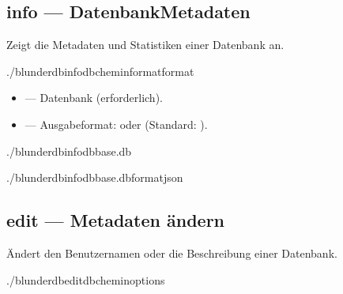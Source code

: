 \documentclass[letterpaper,10pt,german]{sphinxmanual}
\begin{document}
\subsection{info — Datenbank\sphinxhyphen{}Metadaten}
\label{\detokenize{cli:info-metadonnees-de-la-base}}
\sphinxAtStartPar
Zeigt die Metadaten und Statistiken einer Datenbank an.

\begin{sphinxVerbatim}[commandchars=\\\{\}]
./blunderdbinfo\PYGZhy{}\PYGZhy{}db\PYGZlt{}chemin\PYGZgt{}\PYG{o}{[}\PYGZhy{}\PYGZhy{}format\PYGZlt{}format\PYGZgt{}\PYG{o}{]}
\end{sphinxVerbatim}

\sphinxAtStartPar
{}
\begin{itemize}
\item {} 
\sphinxAtStartPar
{} — Datenbank (erforderlich).

\item {} 
\sphinxAtStartPar
{} — Ausgabeformat:  oder  (Standard: ).

\end{itemize}

\sphinxAtStartPar
{}

\begin{sphinxVerbatim}[commandchars=\\\{\}]
./blunderdbinfo\PYGZhy{}\PYGZhy{}dbbase.db

./blunderdbinfo\PYGZhy{}\PYGZhy{}dbbase.db\PYGZhy{}\PYGZhy{}formatjson
\end{sphinxVerbatim}


\subsection{edit — Metadaten ändern}
\label{\detokenize{cli:edit-modifier-les-metadonnees}}
\sphinxAtStartPar
Ändert den Benutzernamen oder die Beschreibung einer Datenbank.

\begin{sphinxVerbatim}[commandchars=\\\{\}]
./blunderdbedit\PYGZhy{}\PYGZhy{}db\PYGZlt{}chemin\PYGZgt{}\PYG{o}{[}options\PYG{o}{]}
\end{sphinxVerbatim}
\end{document}
